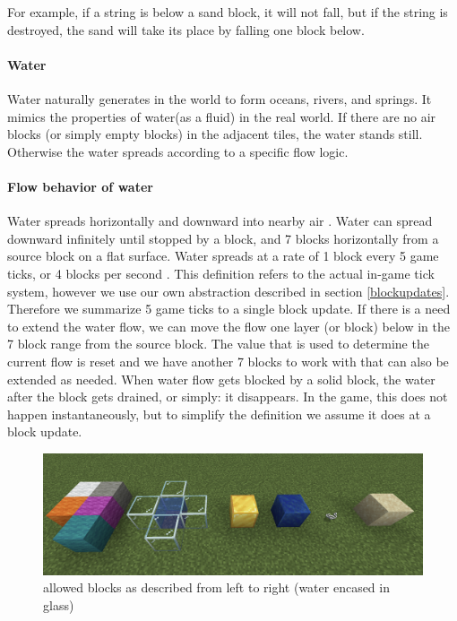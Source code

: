 \noindent \newline For example, if a string is below a sand block, it will not fall, but if the string is destroyed, the sand will take its place by falling one block below.

\pagebreak
\paragraph{Water}
Water naturally generates in the world to form oceans, rivers, and springs\cite{minecraftfandom:water}. 
It mimics the properties of water(as a fluid) in the real world.
If there are no air blocks (or simply empty blocks) in the adjacent tiles,
the water stands still. Otherwise the water spreads according to a specific flow logic.

\paragraph{Flow behavior of water}
Water spreads horizontally and downward into nearby air . Water can spread downward infinitely until stopped by a block, and 7 blocks horizontally from a source block on a flat surface. \newline Water spreads at a rate of 1 block every 5 game ticks, or 4 blocks per second \cite{minecraftfandom:waterspread}.\newline
\newline This definition refers to the actual in-game tick system, however we use our own abstraction described in section \ref{blockupdates}.
Therefore we summarize 5 game ticks to a single block update.
\newline If there is a need to extend the water flow, we can move the flow one layer (or block) below in the 7 block range from the source block.
The value that is used to determine the current flow is reset and we have another 7 blocks to work with that can also be extended as needed.
\newline When water flow gets blocked by a solid block, the water after the block gets drained, or simply: it disappears. In the game, this does not happen instantaneously, but to simplify the definition we assume it does at a block update.

\begin{figure}[h]
    \centering
    \includegraphics[width=\linewidth]{images/allowed blocks.png}
    \caption{allowed blocks as described from left to right (water encased in glass)}
    \label{fig:allowedblocks}
\end{figure}


